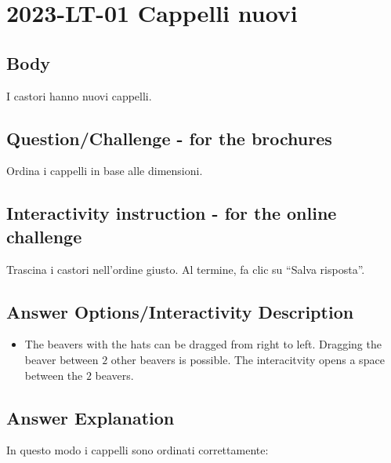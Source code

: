 \documentclass[a4paper,11pt]{report}
\newcommand{\taskGraphicsFolder}{..}
\begin{document}
\section*{\centering{} 2023-LT-01 Cappelli nuovi}


\subsection*{Body}

I castori hanno nuovi cappelli.

{\centering%
\par}

{\em


\subsection*{Question/Challenge - for the brochures}

Ordina i cappelli in base alle dimensioni.

}


\subsection*{Interactivity instruction - for the online challenge}

Trascina i castori nell’ordine giusto. Al termine, fa clic su \enquote{Salva risposta}.

\begingroup
\renewcommand{\arraystretch}{1.5}
\subsection*{Answer Options/Interactivity Description}

\begin{itemize}
  \item The beavers with the hats can be dragged from right to left. Dragging the beaver between $2$ other beavers is possible. The interacitvity opens a space between the $2$ beavers.
\end{itemize}

\endgroup

\subsection*{Answer Explanation}

In questo modo i cappelli sono ordinati correttamente:
\end{document}
